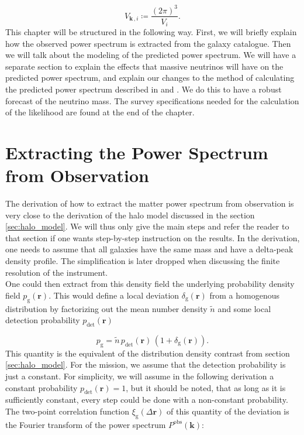 \documentclass[../main.tex]{subfiles}
\begin{document}
\begin{equation*}
    \label{eq:lkl_spectro_v1}
    V_{\boldsymbol{k}\,,i} \coloneqq \frac{(2\pi)^3}{V_{i}}.
\end{equation*}
This chapter will be structured in the following way. First, we will briefly explain how the observed power spectrum is extracted from the galaxy catalogue. Then we will talk about the modeling of the predicted power spectrum. We will have a separate section to explain the effects that massive neutrinos will have on the predicted power spectrum, and explain our changes to the method of calculating the predicted power spectrum described in \cite{Sprenger:2018tdb} and \cite{casas2023euclid}. We do this to have a robust forecast of the neutrino mass. The survey specifications needed for the calculation of the likelihood are found at the end of the chapter.

\section{Extracting the Power Spectrum from Observation}
The derivation of how to extract the matter power spectrum from observation is very close to the derivation of the halo model discussed in the section \ref{sec:halo_model}. We will thus only give the main steps and refer the reader to that section if one wants step-by-step instruction on the results. In the derivation, one needs to assume that all galaxies have the same mass and have a delta-peak density profile. The simplification is later dropped when discussing the finite resolution of the instrument.\\
One could then extract from this density field the underlying probability density field $p_\mathrm{g}(\boldsymbol{r})$. This would define a  local deviation $\delta_\mathrm{g}(\boldsymbol{r})$ from a homogenous distribution by factorizing out the mean number density $\tilde{n} $ and some local detection probability $p_\mathrm{det}(\boldsymbol{r})$ 

\begin{equation}
    p_\mathrm{g} = \tilde{n} \, p_\mathrm{det}(\boldsymbol{r}) \, \left( 1 + \delta_\mathrm{g}(\boldsymbol{r} )\right).
\end{equation}
This quantity is the equivalent of the distribution density contrast from section \ref{sec:halo_model}. For the \Euclid mission, we assume that the detection probability is just a constant. For simplicity, we will assume in the following derivation a constant probability $ p_\mathrm{det}(\boldsymbol{r})=1$, but it should be noted, that as long as it is sufficiently constant, every step could be done with a non-constant probability.\\ 
The two-point correlation function $\xi_\mathrm{g}(\Delta\boldsymbol{r})$ of this quantity of the deviation is the Fourier transform of the power spectrum $P^\mathrm{obs}(\boldsymbol{k})$: 
\end{document}
